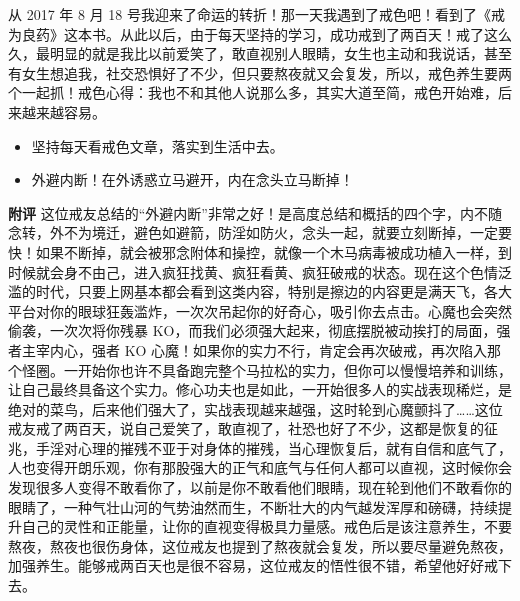 \begin{case}
    从 2017 年 8 月 18 号我迎来了命运的转折！那一天我遇到了戒色吧！看到了《戒为良药》这本书。从此以后，由于每天坚持的学习，成功戒到了两百天！戒了这么久，最明显的就是我比以前爱笑了，敢直视别人眼睛，女生也主动和我说话，甚至有女生想追我，社交恐惧好了不少，但只要熬夜就又会复发，所以，戒色养生要两个一起抓！戒色心得：我也不和其他人说那么多，其实大道至简，戒色开始难，后来越来越容易。

    \begin{itemize}
        \item 坚持每天看戒色文章，落实到生活中去。
        \item 外避内断！在外诱惑立马避开，内在念头立马断掉！
    \end{itemize}

    \textbf{附评} 这位戒友总结的“外避内断”非常之好！是高度总结和概括的四个字，内不随念转，外不为境迁，避色如避箭，防淫如防火，念头一起，就要立刻断掉，一定要快！如果不断掉，就会被邪念附体和操控，就像一个木马病毒被成功植入一样，到时候就会身不由己，进入疯狂找黄、疯狂看黄、疯狂破戒的状态。现在这个色情泛滥的时代，只要上网基本都会看到这类内容，特别是擦边的内容更是满天飞，各大平台对你的眼球狂轰滥炸，一次次吊起你的好奇心，吸引你去点击。心魔也会突然偷袭，一次次将你残暴 KO，而我们必须强大起来，彻底摆脱被动挨打的局面，强者主宰内心，强者 KO 心魔！如果你的实力不行，肯定会再次破戒，再次陷入那个怪圈。一开始你也许不具备跑完整个马拉松的实力，但你可以慢慢培养和训练，让自己最终具备这个实力。修心功夫也是如此，一开始很多人的实战表现稀烂，是绝对的菜鸟，后来他们强大了，实战表现越来越强，这时轮到心魔颤抖了……这位戒友戒了两百天，说自己爱笑了，敢直视了，社恐也好了不少，这都是恢复的征兆，手淫对心理的摧残不亚于对身体的摧残，当心理恢复后，就有自信和底气了，人也变得开朗乐观，你有那股强大的正气和底气与任何人都可以直视，这时候你会发现很多人变得不敢看你了，以前是你不敢看他们眼睛，现在轮到他们不敢看你的眼睛了，一种气壮山河的气势油然而生，不断壮大的内气越发浑厚和磅礴，持续提升自己的灵性和正能量，让你的直视变得极具力量感。戒色后是该注意养生，不要熬夜，熬夜也很伤身体，这位戒友也提到了熬夜就会复发，所以要尽量避免熬夜，加强养生。能够戒两百天也是很不容易，这位戒友的悟性很不错，希望他好好戒下去。
\end{case}

